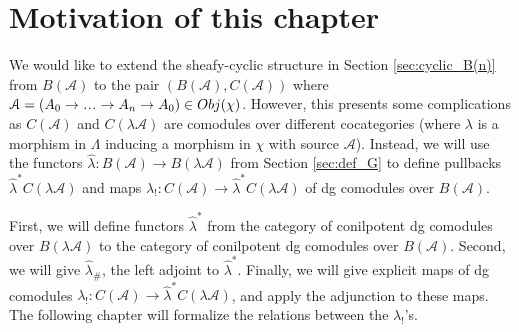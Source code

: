\section{Motivation of this chapter}
We would like to extend the sheafy-cyclic 
structure in Section \ref{sec:cyclic_B(n)} from 
$B(\mathcal{A})$ to the pair $(B(\mathcal{A}), 
C(\mathcal{A}))$ where $\mathcal{A} = 
(A_0 \to \smdots \to A_n \to A_0) \in Obj(\chi)$. 
However, this presents some complications 
as $C(\mathcal{A})$ and $C(\lambda \mathcal{A})$ 
are comodules over different 
cocategories (where $\lambda$ is a morphism 
in $\Lambda$ inducing a morphism in $\chi$ 
with source $\mathcal{A}$). 
Instead, we will use 
the functors $\hat{\lambda}: B(\mathcal{A}) 
\to B(\lambda \mathcal{A})$ from Section 
\ref{sec:def_G} to
define pullbacks $\hat{\lambda}^*
C(\lambda \mathcal{A})$ 
and maps $\lambda_!: C(\mathcal{A}) 
\to \hat{\lambda}^*C(\lambda \mathcal{A})$ 
of dg comodules over $B(\mathcal{A})$. 

First, we will define functors $\hat{\lambda}^*$ 
from the category of 
conilpotent dg comodules over $B(\lambda \mathcal{A})$ 
to the category of conilpotent dg comodules 
over $B(\mathcal{A})$. 
Second, we will give $\hat{\lambda}_\#$, the left adjoint 
to $\hat{\lambda}^*$. Finally, we will 
give explicit maps of dg comodules 
$\lambda_!: C(\mathcal{A}) \to 
\hat{\lambda}^*C(\lambda \mathcal{A})$, 
and apply the adjunction 
to these maps. The following chapter will formalize 
the relations between the $\lambda_!$'s.